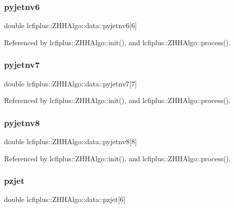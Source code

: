 \subsubsection{pyjetnv6}
{\footnotesize\ttfamily double lcfiplus\+::\+Z\+H\+H\+Algo\+::data\+::pyjetnv6[6]}



Referenced by lcfiplus\+::\+Z\+H\+H\+Algo\+::init(), and lcfiplus\+::\+Z\+H\+H\+Algo\+::process().

\mbox{\label{structlcfiplus_1_1ZHHAlgo_1_1data_a974f8f065f8b856dd07686fc2afb179b}} 
\subsubsection{pyjetnv7}
{\footnotesize\ttfamily double lcfiplus\+::\+Z\+H\+H\+Algo\+::data\+::pyjetnv7[7]}



Referenced by lcfiplus\+::\+Z\+H\+H\+Algo\+::init(), and lcfiplus\+::\+Z\+H\+H\+Algo\+::process().

\mbox{\label{structlcfiplus_1_1ZHHAlgo_1_1data_a821e31ed6ba9910bdc04875e7b4a8dbe}} 
\subsubsection{pyjetnv8}
{\footnotesize\ttfamily double lcfiplus\+::\+Z\+H\+H\+Algo\+::data\+::pyjetnv8[8]}



Referenced by lcfiplus\+::\+Z\+H\+H\+Algo\+::init(), and lcfiplus\+::\+Z\+H\+H\+Algo\+::process().

\mbox{\label{structlcfiplus_1_1ZHHAlgo_1_1data_ad386a26a0859bcd536cdcc871a7b0a81}} 
\subsubsection{pzjet}
{\footnotesize\ttfamily double lcfiplus\+::\+Z\+H\+H\+Algo\+::data\+::pzjet[6]}



